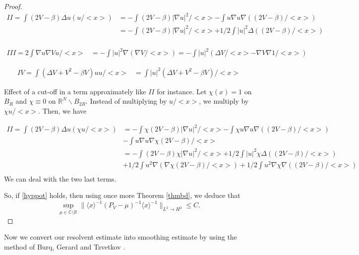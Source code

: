 \documentclass[10pt,leqno]{amsart}
\numberwithin{equation}{section}
\newcommand{\field}[1]{\mathbb{#1}}
\newcommand{\R}{\field{R}}          		%
\begin{document}
\begin{proof}
\begin{align*}
II=\int (2V-\beta) \Delta u (u/<x>) &=- \int (2V -\beta) |\nabla u|^2 /<x> - \int u\nabla u \nabla ((2V-\beta)/<x> )\\
&= - \int (2V -\beta) |\nabla u|^2 /<x> + 1/2 \int |u|^2 \Delta ((2V-\beta)/<x> )\\
\end{align*}

\begin{align*}
III= 2\int \nabla u \nabla V u/<x> &= -   \int |u|^2 \nabla (\nabla V/<x>)= -\int |u|^2 (\Delta V /<x> - \nabla V \nabla 1/<x>)
\end{align*}


\begin{align*}
IV=\int  (\Delta V +V^2 -\beta V) u u/<x> &= \int |u|^2  (\Delta V +V^2 -\beta V) /<x>
\end{align*}

Effect of a cut-off in a term approximately like $II$ for instance. Let $\chi (x)=1$ on $B_R$ and $\chi \equiv 0$ on $\R^N \backslash B_{2R}$. Instead of multiplying by $u/<x>$, we multiply by $\chi u/<x>$. Then, we have

\begin{align*}
II=\int (2V-\beta) \Delta u (\chi u /<x>) &=- \int \chi (2V -\beta) |\nabla u|^2 /<x> - \int \chi u\nabla u \nabla ((2V-\beta)/<x> )\\
& - \int u\nabla u \nabla \chi (2V-\beta)/<x>   \\
&= - \int (2V -\beta) \chi |\nabla u|^2 /<x> + 1/2 \int |u|^2 \chi \Delta ((2V-\beta)/<x> )\\
&+1/2\int u^2 \nabla (  \nabla \chi (2V-\beta)/<x> )+1/2 \int u^2 \nabla \chi \nabla ((2V-\beta)/<x> )   \\
\end{align*}
We can deal with the two last terms. \fi

So, if %
\eqref{hyppot} holds, 
then using once more Theorem \ref{thmbd}, we deduce that
$$\sup_{\mu \in \mathbb{C} \setminus \R}\big\|\langle x\rangle ^{-1} (P_V-\mu)^{-1} \langle x\rangle ^{-1} \big\|_{L^2  \rightarrow H^2 }\leq C.$$
\end{proof}

Now we convert our resolvent estimate into smoothing estimate by using the method of Burq, Gerard and Tzvetkov \cite{BGT}.
\end{document}
